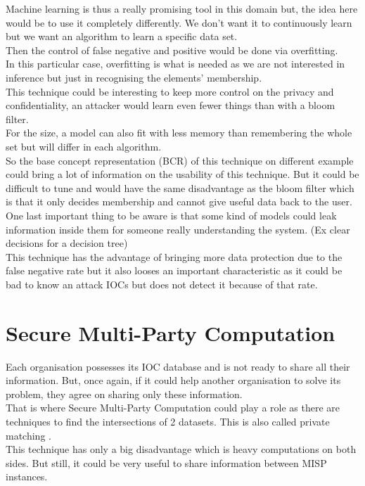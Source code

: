 \documentclass{eplmastersthesis}
\begin{document}
Machine learning is thus a really promising tool in this domain but, the idea here would be to use it completely differently. We don't want it to continuously learn but we want an algorithm to learn a specific data set.\\
Then the control of false negative and positive would be done via overfitting.\\
In this particular case, overfitting is what is needed as we are not interested in inference but just in recognising the elements' membership.\\

This technique could be interesting to keep more control on the privacy and confidentiality, an attacker would learn even fewer things than with a bloom filter.\\
For the size, a model can also fit with less memory than remembering the whole set but will differ in each algorithm.\\
So the base concept representation (BCR) of this technique on different example could bring a lot of information on the usability of this technique. But it could be difficult to tune and would have the same disadvantage as the bloom filter which is that it only decides membership and cannot give useful data back to the user. One last important thing to be aware is that some kind of models could leak information inside them for someone really understanding the system. (Ex clear decisions for a decision tree)\\

This technique has the advantage of bringing more data protection due to the false negative rate but it also looses an important characteristic as it could be bad to know an attack IOCs but does not detect it because of that rate.

\section{Secure Multi-Party Computation}
Each organisation possesses its IOC database and is not ready to share all their information. But, once again, if it could help another organisation to solve its problem, they agree on sharing only these information.\\
That is where Secure Multi-Party Computation could play a role as there are techniques to find the intersections of 2 datasets. This is also called private matching \cite{agrawal2003information, li2005private}.\\

This technique has only a big disadvantage which is heavy computations on both sides. But still, it could be very useful to share information between MISP instances.
\end{document}
